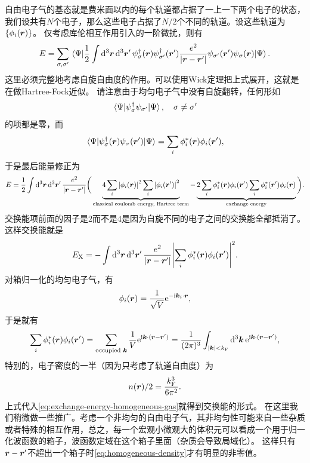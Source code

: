 自由电子气的基态就是费米面以内的每个轨道都占据了一上一下两个电子的状态，我们设共有$N$个电子，那么这些电子占据了$N/2$个不同的轨道。设这些轨道为$\{\phi_i(\vb*{r})\}$。
仅考虑库伦相互作用引入的一阶微扰，则有
\[
    E = \sum_{\sigma, \sigma'} \mel{\Psi}{
        \frac{1}{2} \int \dd[3]{\vb*{r}} \dd[3]{\vb*{r}'} {\psi}^\dagger_{\sigma}(\vb*{r}) {\psi}^\dagger_{\sigma'}(\vb*{r}') \frac{e^2}{\abs{\vb*{r} - \vb*{r}'}} {\psi}_{\sigma'}(\vb*{r}') {\psi}_\sigma(\vb*{r})
    }{\Psi}.
\]
这里必须完整地考虑自旋自由度的作用。可以使用Wick定理把上式展开，这就是在做Hartree-Fock近似。
请注意由于均匀电子气中没有自旋翻转，任何形如
\[
    \mel{\Psi}{{\psi}_\sigma^\dagger {\psi}_{\sigma'}}{\Psi}, \quad \sigma \neq \sigma'
\]
的项都是零，而
\[
    \mel{\Psi}{{\psi}^\dagger_\sigma(\vb*{r}) {\psi}_{\sigma}(\vb*{r}')}{\Psi} = \sum_i \phi_i^*(\vb*{r}) \phi_i(\vb*{r}'),
\]
于是最后能量修正为
\[
    E = \frac{1}{2} \int \dd[3]{\vb*{r}} \dd[3]{\vb*{r}'} \frac{e^2}{\abs{\vb*{r} - \vb*{r}'}} \bigg(
        \underbrace{4 \sum_{i} \abs{\phi_i(\vb*{r})}^2 \sum_{i} \abs{\phi_i(\vb*{r}')}^2}_\text{classical coulomb energy, Hartree term} - \underbrace{2 \sum_i \phi_i^*(\vb*{r}) \phi_i(\vb*{r}') \sum_i \phi_i^*(\vb*{r}') \phi_i(\vb*{r})}_\text{exchange energy}
    \bigg).
\]
交换能项前面的因子是$2$而不是$4$是因为自旋不同的电子之间的交换能全部抵消了。这样交换能就是
\begin{equation}
    E_\text{X} = - \int \dd[3]{\vb*{r}} \dd[3]{\vb*{r}'} \frac{e^2}{\abs{\vb*{r} - \vb*{r}'}} \abs{\sum_i \phi_i^*(\vb*{r}) \phi_i(\vb*{r}')}^2 . 
    \label{eq:exchange-energy-homogeneous-gas}
\end{equation}
对箱归一化的均匀电子气，有
\[
    \phi_i(\vb*{r}) = \frac{1}{\sqrt{V}} \mathrm{e}^{- \mathrm{i} \vb*{k}_i \cdot \vb*{r}},
\]
于是就有
\begin{equation}
    \sum_i \phi_i^*(\vb*{r}) \phi_i(\vb*{r}') = \sum_{\text{occupied $\vb*{k}$}} \frac{1}{V} \mathrm{e}^{\mathrm{i} \vb*{k} \cdot (\vb*{r} - \vb*{r}')} = \frac{1}{(2\pi)^3} \int_{\abs{\vb*{k}} < k_\text{F}} \dd[3]{\vb*{k}} \mathrm{e}^{\mathrm{i} \vb*{k} \cdot (\vb*{r} - \vb*{r}')},
    \label{eq:homogeneous-density}
\end{equation}
特别的，电子密度的一半（因为只考虑了轨道自由度）为
\[
    n(\vb*{r}) / 2 = \frac{k_\text{F}^3}{6 \pi^2}.
\]
上式代入\eqref{eq:exchange-energy-homogeneous-gas}就得到交换能的形式。
在这里我们稍微做一些推广。考虑一个非均匀的自由电子气，其非均匀性可能来自一些杂质或者特殊的相互作用，总之，每一个宏观小微观大的体积元可以看成一个用于归一化波函数的箱子，波函数定域在这个箱子里面（杂质会导致局域化）。
这样只有$\vb*{r} - \vb*{r}'$不超出一个箱子时\eqref{eq:homogeneous-density}才有明显的非零值。
